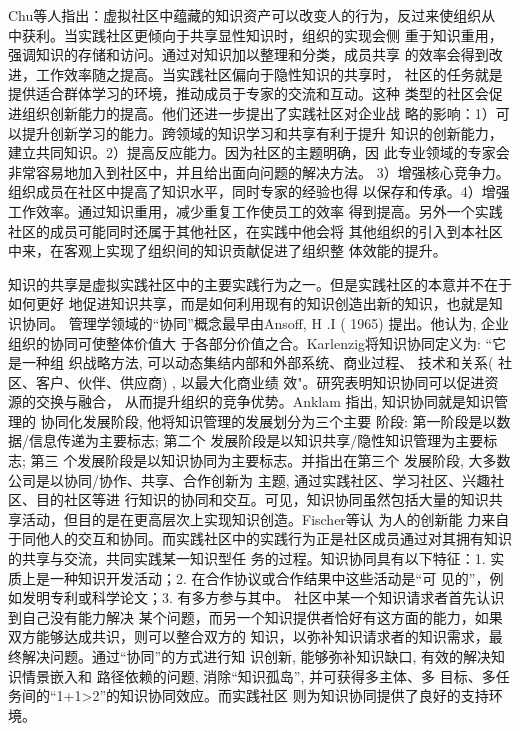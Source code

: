Chu等人指出：虚拟社区中蕴藏的知识资产可以改变人的行为，反过来使组织从
中获利\cite{Chu2008}。当实践社区更倾向于共享显性知识时，组织的实现会侧
重于知识重用，强调知识的存储和访问。通过对知识加以整理和分类，成员共享
的效率会得到改进，工作效率随之提高。当实践社区偏向于隐性知识的共享时，
社区的任务就是提供适合群体学习的环境，推动成员于专家的交流和互动。这种
类型的社区会促进组织创新能力的提高。他们还进一步提出了实践社区对企业战
略的影响：1）可以提升创新学习的能力。跨领域的知识学习和共享有利于提升
知识的创新能力，建立共同知识。2）提高反应能力。因为社区的主题明确，因
此专业领域的专家会非常容易地加入到社区中，并且给出面向问题的解决方法。
3）增强核心竞争力。组织成员在社区中提高了知识水平，同时专家的经验也得
以保存和传承。4）增强工作效率。通过知识重用，减少重复工作使员工的效率
得到提高。另外一个实践社区的成员可能同时还属于其他社区，在实践中他会将
其他组织的引入到本社区中来，在客观上实现了组织间的知识贡献促进了组织整
体效能的提升\cite{Garrety2004}。

知识的共享是虚拟实践社区中的主要实践行为之一。但是实践社区的本意并不在于如何更好
地促进知识共享，而是如何利用现有的知识创造出新的知识，也就是知识协同。
管理学领域的“协同”概念最早由Ansoff, H .I
( 1965) 提出。他认为, 企业组织的协同可使整体价值大
于各部分价值之合\cite{Ansoff1965}。Karlenzig将知识协同定义为: “它是一种组
织战略方法, 可以动态集结内部和外部系统、商业过程、
技术和关系( 社区、客户、伙伴、供应商) , 以最大化商业绩
效"\cite{karlenzig2002tip}。研究表明知识协同可以促进资源的交换与融合，
从而提升组织的竞争优势\cite{ghoshal1998sci,galunic1998rrf}。Anklam 指出, 知识协同就是知识管理的
协同化发展阶段, 他将知识管理的发展划分为三个主要
阶段: 第一阶段是以数据/信息传递为主要标志; 第二个
发展阶段是以知识共享/隐性知识管理为主要标志; 第三
个发展阶段是以知识协同为主要标志。并指出在第三个
发展阶段, 大多数公司是以协同/协作、共享、合作创新为
主题, 通过实践社区、学习社区、兴趣社区、目的社区等进
行知识的协同和交互\cite{anklam2002kmc}。可见，知识协同虽然包括大量的知识共
享活动，但目的是在更高层次上实现知识创造\cite{Heiman2004}。Fischer等认
为人的创新能
力来自于同他人的交互和协同\cite{Fischer2005}。而实践社区中的实践行为正是社区成员通过对其拥有知识的共享与交流，共同实践某一知识型任
务的过程。知识协同具有以下特征：1. 实质上是一种知识开发活动；2.  在合作协议或合作结果中这些活动是“可
见的”，例如发明专利或科学论文；3. 有多方参与其中\cite{mckelvey2003dcl}。
社区中某一个知识请求者首先认识到自己没有能力解决
某个问题，而另一个知识提供者恰好有这方面的能力，如果双方能够达成共识，则可以整合双方的
知识，以弥补知识请求者的知识需求，最终解决问题\cite{Leijen2002}。通过“协同”的方式进行知
识创新, 能够弥补知识缺口, 有效的解决知识情景嵌入和
路径依赖的问题, 消除“知识孤岛”, 并可获得多主体、多
目标、多任务间的“1+1>2”的知识协同效应\cite{fanzhiping2007}。而实践社区
则为知识协同提供了良好的支持环境。




